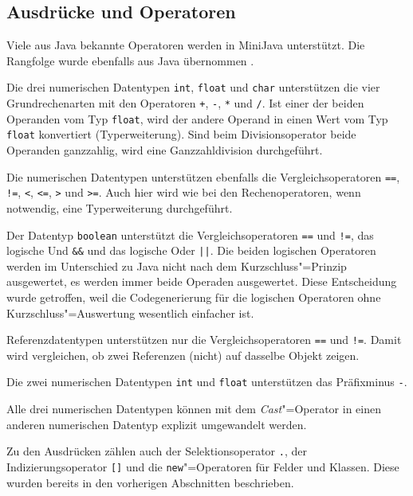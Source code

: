 

\subsection{Ausdrücke und Operatoren}

Viele aus Java bekannte Operatoren werden in MiniJava unterstützt. Die Rangfolge wurde ebenfalls aus Java übernommen \cite{JavaOperators}.

Die drei numerischen Datentypen \lstinline{int}, \lstinline{float} und \lstinline{char} unterstützen die vier Grundrechenarten mit den Operatoren \lstinline{+}, \lstinline{-}, \lstinline{*} und \lstinline{/}. Ist einer der beiden Operanden vom Typ \lstinline{float}, wird der andere Operand in einen Wert vom Typ \lstinline{float} konvertiert (Typerweiterung). Sind beim Divisionsoperator beide Operanden ganzzahlig, wird eine Ganzzahldivision durchgeführt.

Die numerischen Datentypen unterstützen ebenfalls die Vergleichsoperatoren \lstinline{==}, \lstinline{!=}, \mbox{\lstinline{<},} \lstinline{<=}, \lstinline{>} und \lstinline{>=}. Auch hier wird wie bei den Rechenoperatoren, wenn notwendig, eine Typerweiterung durchgeführt.

Der Datentyp \lstinline{boolean} unterstützt die Vergleichsoperatoren \lstinline{==} und \lstinline{!=}, das logische Und \lstinline{&&} und das logische Oder \lstinline{||}. Die beiden logischen Operatoren werden im Unterschied zu Java nicht nach dem Kurzschluss"=Prinzip ausgewertet, es werden immer beide Operaden ausgewertet. Diese Entscheidung wurde getroffen, weil die Codegenerierung für die logischen Operatoren ohne Kurzschluss"=Auswertung wesentlich einfacher ist.

Referenzdatentypen unterstützen nur die Vergleichsoperatoren \lstinline{==} und \lstinline{!=}. Damit wird vergleichen, ob zwei Referenzen (nicht) auf dasselbe Objekt zeigen.

Die zwei numerischen Datentypen \lstinline{int} und \lstinline{float} unterstützen das Präfixminus \lstinline{-}.

Alle drei numerischen Datentypen können mit dem \emph{Cast}"=Operator in einen anderen numerischen Datentyp explizit umgewandelt werden.

Zu den Ausdrücken zählen auch der Selektionsoperator \lstinline{.}, der Indizierungsoperator \lstinline{[]} und die \lstinline{new}"=Operatoren für Felder und Klassen. Diese wurden bereits in den vorherigen Abschnitten beschrieben.

